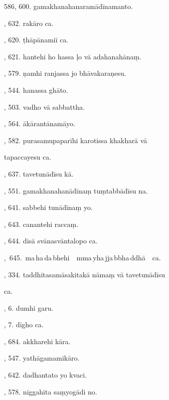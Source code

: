 586, 600. gamakhanahanaramādīnamanto.\hfill \pageref{sut:586}\par {}, 632. rakāro ca.\hfill \pageref{sut:587}\par {}, 620. ṭhāpānamiī ca.\hfill \pageref{sut:588}\par {}, 621. hantehi ho hassa ḷo vā adahanahānaṃ.\hfill \pageref{sut:589}\par {}, 579. ṇamhi ranjassa jo bhāvakaraṇesu.\hfill \pageref{sut:590}\par {}, 544. hanassa ghāto.\hfill \pageref{sut:591}\par {}, 503. vadho vā sabbattha.\hfill \pageref{sut:592}\par {}, 564. ākārantānamāyo.\hfill \pageref{sut:593}\par {}, 582. purasamupaparīhi karotissa khakharā vā\par \noindent
\hspace{15mm} tapaccayesu ca.\hfill \pageref{sut:594}\par {}, 637. tavetunādīsu kā.\hfill \pageref{sut:595}\par {}, 551. gamakhanahanādīnaṃ tuṃtabbādīsu na.\hfill \pageref{sut:596}\par {}, 641. sabbehi tunādīnaṃ yo.\hfill \pageref{sut:597}\par {}, 643. canantehi raccaṃ.\hfill \pageref{sut:598}\par {}, 644. disā svānasvāntalopo ca.\hfill \pageref{sut:599}\par {},~645.~ma\,ha\,da\,bhehi\ \ mma\,yha\,jja\,bbha\,ddhā\ \ ca.\hfill \pageref{sut:600}\par {}, 334. taddhitasamāsakitakā nāmaṃ vā tavetunādīsu\par \noindent
\hspace{15mm} ca.\hfill \pageref{sut:601}\par {}, 6. dumhi garu.\hfill \pageref{sut:602}\par {}, 7. dīgho ca.\hfill \pageref{sut:603}\par {}, 684. akkharehi kāra.\hfill \pageref{sut:604}\par {}, 547. yathāgamamikāro.\hfill \pageref{sut:605}\par {}, 642. dadhantato yo kvaci.\hfill \pageref{sut:606}\par {}, 578. niggahita saṃyogādi no.\hfill \pageref{sut:607}\par \noindent
